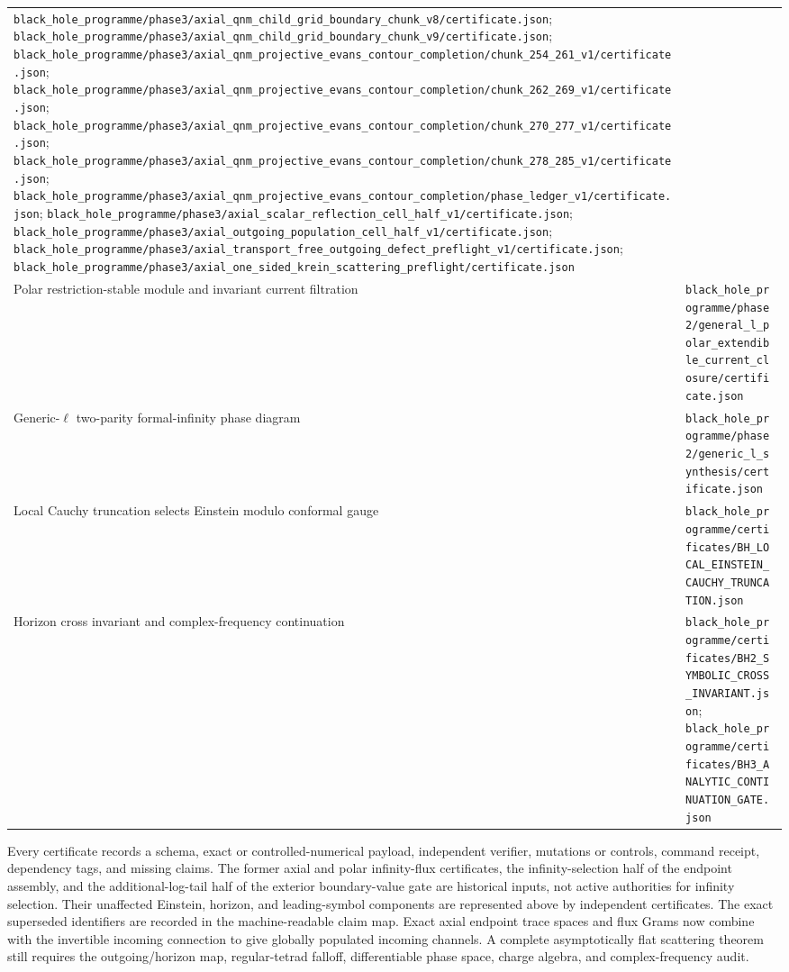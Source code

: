 \documentclass[11pt]{article}
\theoremstyle{definition}
\theoremstyle{remark}
\newcommand{\cert}[1]{\nolinkurl{#1}}
\begin{document}
{\begin{longtable}{@{}p{}p{}@{}}
\cert{black_hole_programme/phase3/axial_qnm_child_grid_boundary_chunk_v8/certificate.json};
\cert{black_hole_programme/phase3/axial_qnm_child_grid_boundary_chunk_v9/certificate.json};
\cert{black_hole_programme/phase3/axial_qnm_projective_evans_contour_completion/chunk_254_261_v1/certificate.json};
\cert{black_hole_programme/phase3/axial_qnm_projective_evans_contour_completion/chunk_262_269_v1/certificate.json};
\cert{black_hole_programme/phase3/axial_qnm_projective_evans_contour_completion/chunk_270_277_v1/certificate.json};
\cert{black_hole_programme/phase3/axial_qnm_projective_evans_contour_completion/chunk_278_285_v1/certificate.json};
\cert{black_hole_programme/phase3/axial_qnm_projective_evans_contour_completion/phase_ledger_v1/certificate.json};
\cert{black_hole_programme/phase3/axial_scalar_reflection_cell_half_v1/certificate.json};
\cert{black_hole_programme/phase3/axial_outgoing_population_cell_half_v1/certificate.json};
\cert{black_hole_programme/phase3/axial_transport_free_outgoing_defect_preflight_v1/certificate.json};
\cert{black_hole_programme/phase3/axial_one_sided_krein_scattering_preflight/certificate.json}\\
Polar restriction-stable module and invariant current filtration &
\cert{black_hole_programme/phase2/general_l_polar_extendible_current_closure/certificate.json}\\
Generic-\(\ell\) two-parity formal-infinity phase diagram &
\cert{black_hole_programme/phase2/generic_l_synthesis/certificate.json}\\
Local Cauchy truncation selects Einstein modulo conformal gauge &
\cert{black_hole_programme/certificates/BH_LOCAL_EINSTEIN_CAUCHY_TRUNCATION.json}\\
Horizon cross invariant and complex-frequency continuation &
\cert{black_hole_programme/certificates/BH2_SYMBOLIC_CROSS_INVARIANT.json};
\cert{black_hole_programme/certificates/BH3_ANALYTIC_CONTINUATION_GATE.json}\\
\bottomrule
\end{longtable}
}

Every certificate records a schema, exact or controlled-numerical payload,
independent verifier, mutations or controls, command receipt, dependency
tags, and missing claims.  The former axial and polar infinity-flux
certificates, the infinity-selection half of the endpoint assembly, and the
additional-log-tail half of the exterior boundary-value gate are historical
inputs, not active authorities for infinity selection.  Their unaffected
Einstein, horizon, and leading-symbol components are represented above by
independent certificates.  The exact superseded identifiers are recorded in
the machine-readable claim map.  Exact axial endpoint trace spaces and flux
Grams now combine with the invertible incoming connection to give globally
populated incoming channels.  A complete asymptotically flat scattering
theorem still requires the outgoing/horizon map, regular-tetrad falloff,
differentiable phase space, charge algebra, and complex-frequency audit.
\end{document}

